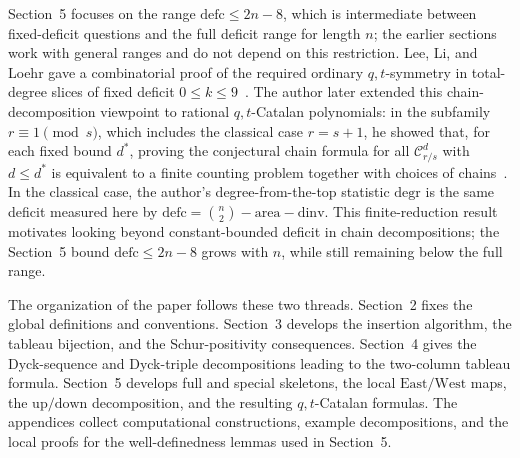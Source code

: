 \documentclass[11pt]{article}
\theoremstyle{plain}
\theoremstyle{definition}
\theoremstyle{remark}
\newcommand{\dinv}{\mathrm{dinv}}
\newcommand{\area}{\mathrm{area}}
\newcommand{\defc}{\mathrm{defc}}
\begin{document}
Section~5 focuses on the range \(\defc\le 2n-8\), which is intermediate
between fixed-deficit questions and the full deficit range for length \(n\);
the earlier sections work with general ranges and do not depend on this
restriction.  Lee, Li, and Loehr gave a combinatorial proof of the required
ordinary \(q,t\)-symmetry in total-degree slices of fixed deficit
\(0\le k\le 9\)~\cite{LeeLiLoehr2018}.  The author later extended this
chain-decomposition viewpoint to rational \(q,t\)-Catalan polynomials: in the
subfamily \(r\equiv1\pmod s\), which includes the classical case \(r=s+1\), he
showed that, for each fixed bound \(d^*\), proving the conjectural chain
formula for all \(\mathcal C_{r/s}^d\) with \(d\le d^*\) is equivalent to a
finite counting problem together with choices of chains~\cite{Hawkes2024}.  In
the classical case, the author's degree-from-the-top statistic
\(\mathrm{degr}\) is the same deficit measured here by
\(\defc=\binom n2-\area-\dinv\).  This finite-reduction result motivates
looking beyond constant-bounded deficit in chain decompositions; the
Section~5 bound \(\defc\le 2n-8\) grows with \(n\), while still remaining below
the full range.

The organization of the paper follows these two threads.  Section~2 fixes the
global definitions and conventions.  Section~3 develops the insertion
algorithm, the tableau bijection, and the Schur-positivity consequences.
Section~4 gives the Dyck-sequence and Dyck-triple decompositions leading to
the two-column tableau formula.  Section~5 develops full and special skeletons,
the local \(\mathrm{East}/\mathrm{West}\) maps, the
\(\mathrm{up}/\mathrm{down}\) decomposition, and the resulting
\(q,t\)-Catalan formulas.  The appendices collect computational
constructions, example decompositions, and the local proofs for the
well-definedness lemmas used in Section~5.


\end{document}
